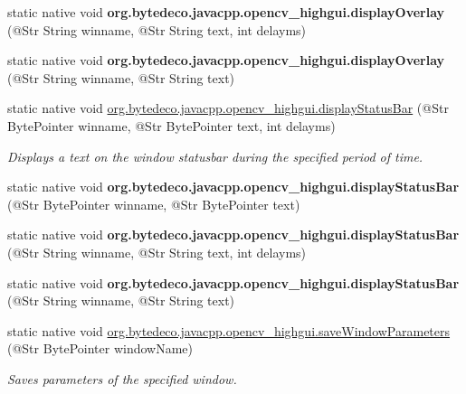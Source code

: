 \begin{DoxyCompactItemize}
\item 
\mbox{\label{group__highgui__qt_ga8ac3d9680e5842dd0b898cfcd86d0f56}} 
static native void {\bfseries org.\+bytedeco.\+javacpp.\+opencv\+\_\+highgui.\+display\+Overlay} (@Str String winname, @Str String text, int delayms)
\item 
\mbox{\label{group__highgui__qt_gab282b940590a7dcc62b9f238e163f0cb}} 
static native void {\bfseries org.\+bytedeco.\+javacpp.\+opencv\+\_\+highgui.\+display\+Overlay} (@Str String winname, @Str String text)
\item 
static native void \hyperlink{group__highgui__qt_ga50de3d06722cc9fbc0054f3c83902f1f}{org.\+bytedeco.\+javacpp.\+opencv\+\_\+highgui.\+display\+Status\+Bar} (@Str Byte\+Pointer winname, @Str Byte\+Pointer text, int delayms)
\begin{DoxyCompactList}\small\item\em Displays a text on the window statusbar during the specified period of time. \end{DoxyCompactList}\item 
\mbox{\label{group__highgui__qt_gac836f33469d9f3fd98c3893e5c32a812}} 
static native void {\bfseries org.\+bytedeco.\+javacpp.\+opencv\+\_\+highgui.\+display\+Status\+Bar} (@Str Byte\+Pointer winname, @Str Byte\+Pointer text)
\item 
\mbox{\label{group__highgui__qt_gaf2f3872accc79c44498b025a4a58feb7}} 
static native void {\bfseries org.\+bytedeco.\+javacpp.\+opencv\+\_\+highgui.\+display\+Status\+Bar} (@Str String winname, @Str String text, int delayms)
\item 
\mbox{\label{group__highgui__qt_ga9ca876bfa57872ca4f80cb17326d18af}} 
static native void {\bfseries org.\+bytedeco.\+javacpp.\+opencv\+\_\+highgui.\+display\+Status\+Bar} (@Str String winname, @Str String text)
\item 
static native void \hyperlink{group__highgui__qt_gac1ea25caaa8647ae67972ac417776344}{org.\+bytedeco.\+javacpp.\+opencv\+\_\+highgui.\+save\+Window\+Parameters} (@Str Byte\+Pointer window\+Name)
\begin{DoxyCompactList}\small\item\em Saves parameters of the specified window. \end{DoxyCompactList}\item 

\end{DoxyCompactItemize}
